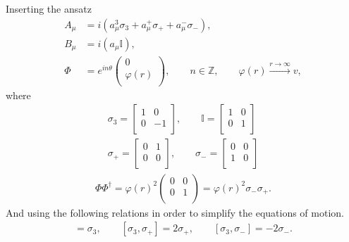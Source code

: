 Inserting the ansatz
\begin{align}
    A_{\mu} &= i \left(a_{\mu}^3 \sigma_3 + a_{\mu}^+ \sigma_{+} +a_{\mu}^{-} \sigma_{-} \right), \label{eq:U2_ansatz_non_abelian_gauge} \\
    B_{\mu} &= i \left( a_{\mu} \mathbb{I} \right), \label{eq:U2_ansatz_abelian_gauge}\\
    \Phi &=  e^{i n \theta} \begin{pmatrix}
        0\\
        \varphi(r)\\
    \end{pmatrix}, \qquad n\in \mathbb{Z}, \qquad \varphi(r) \xrightarrow{r \rightarrow \infty} v, \label{eq:U2_ansatz_scalar}
\end{align}
    where
    \begin{align}
        \sigma_3 = \begin{bmatrix}
            1 & 0 \\
            0 & -1 \\
        \end{bmatrix}, \qquad \mathbb{I}= \begin{bmatrix}
            1 & 0\\
            0 & 1\\
        \end{bmatrix} \\
        \sigma_+ =\begin{bmatrix}
            0 & 1\\
            0 & 0\\
        \end{bmatrix}, \qquad \sigma_- = \begin{bmatrix}
            0 &0\\
            1 &0\\
        \end{bmatrix}
    \end{align}
    \begin{align}
        \Phi \Phi^{\dag} = \varphi(r)^2 \begin{pmatrix} 
            0 & 0\\
            0 & 1\\
        \end{pmatrix} = \varphi(r)^2 \sigma_- \sigma_+.
    \end{align}
    And using the following relations in order to simplify the equations of motion.
    \begin{align}
        [\sigma_+, \sigma_-] = \sigma_3, \qquad [\sigma_3, \sigma_+] = 2 \sigma_+, \qquad [\sigma_3, \sigma_-] = -2 \sigma_-.
    \end{align}
